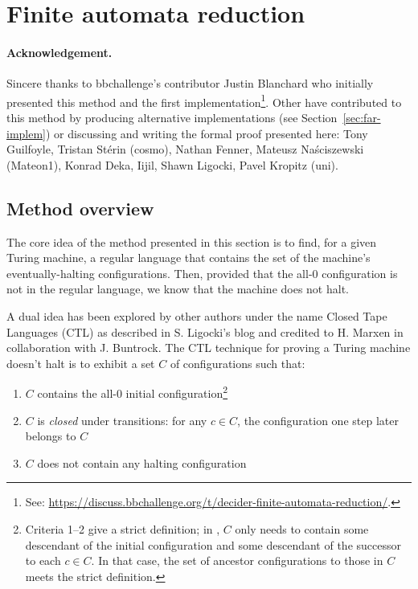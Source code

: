 
\newpage
\section{Finite automata reduction}\label{sec:finite-automata-reduction}

\paragraph{Acknowledgement.} Sincere thanks to bbchallenge's contributor Justin Blanchard who initially presented this method and the first implementation\footnote{See: \url{https://discuss.bbchallenge.org/t/decider-finite-automata-reduction/}.}. Other have contributed to this method by producing alternative implementations (see Section~\ref{sec:far-implem}) or discussing and writing the formal proof presented here: Tony Guilfoyle, Tristan Stérin (cosmo), Nathan Fenner, Mateusz Naściszewski (Mateon1), Konrad Deka, Iijil, Shawn Ligocki, Pavel Kropitz (uni). %


\subsection{Method overview}\label{far-overview}

The core idea of the method presented in this section is to find, for a given Turing machine, a regular language that contains the set of the machine's eventually-halting configurations. Then, provided that the all-0 configuration is not in the regular language, we know that the machine does not halt.

A dual idea has been explored by other authors under the name Closed Tape Languages (CTL) as described in S. Ligocki's blog \cite{ShawnCTL} and credited to H. Marxen in collaboration with J. Buntrock.
The CTL technique for proving a Turing machine doesn't halt is to exhibit a set $C$ of configurations such that:

\begin{enumerate}
  \item $C$ contains the all-0 initial configuration\footnote{
          Criteria 1--2 give a strict definition; in \cite{ShawnCTL}, $C$ only needs to contain some descendant of the initial configuration and some descendant of the successor to each $c\in C$.
          In that case, the set of ancestor configurations to those in $C$ meets the strict definition.
        }
  \item $C$ is \textit{closed} under transitions: for any $c \in C$, the configuration one step later belongs to $C$\addtocounter{footnote}{-1}\addtocounter{Hfootnote}{-1}\footnotemark
  \item $C$ does not contain any halting configuration
\end{enumerate}


